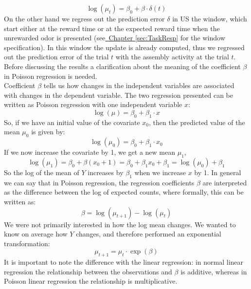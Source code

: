 \begin{equation}
    \log(\mu_t)=\beta_0+\beta\cdot\delta(t)
    \label{eq:regrDelta}
\end{equation}
On the other hand we regress out the prediction error $\delta$ in US the window, which start either at the reward time or at the expected reward time when the unrewarded odor is presented (see\hyperref[sec:TaskResp]{~Chapter \ref*{sec:TaskResp}} for the window specification). In this window the update is already computed, thus we regressed out the prediction error of the trial $t$ with the assembly activity at the trial $t$.\\
Before discussing the results a clarification about the meaning of the coefficient $\beta$ in Poisson regression is needed.\\
Coefficient $\beta$ tells us how changes in the independent variables are associated with changes in the dependent variable.
The two regression presented can be written as Poisson regression with one independent variable $x$:
\begin{equation}
    \log(\mu)=\beta_0+\beta_1\cdot x
    \label{eq:betaCoeff}
\end{equation}
So, if we have an initial value of the covariate $x_0$, then the predicted value of the mean $\mu_0$ is given by:
\begin{equation*}
    \log(\mu_0)=\beta_0+\beta_1\cdot x_0
    \label{eq:betaCoeff0}
\end{equation*}
If we now increase the covariate by 1, we get a new mean $\mu_1$,
\begin{equation*}
    \log(\mu_1)=\beta_0+\beta(x_0+1)=\beta_0+\beta_1x_0+\beta_1=\log(\mu_0)+\beta_1
    \label{eq:betaCoeff1}
\end{equation*}
So the log of the mean of $Y$ increases by $\beta_1$ when we increase $x$ by 1.
In general we can say that in Poisson regression, the regression coefficients $\beta$ are interpreted as the difference between the log of expected counts, where formally, this can be written as:
\begin{equation}
    \beta=\log(\mu_{t+1})-\log(\mu_t)
    \label{eq:BetaRelLog}
\end{equation}
We were not primarily interested in how the log mean changes. We wanted to know on average how $Y$ changes, and therefore performed an exponential transformation:
\begin{equation}
    \mu_{t+1}=\mu_t\cdot \exp(\beta)
    \label{eq:BetaRelExp}
\end{equation}
It is important to note the difference with the linear regression: in normal linear regression the relationship between the observations and $\beta$ is additive, whereas in Poisson linear regression the relationship is multiplicative.\\
